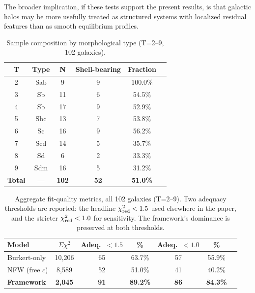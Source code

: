The broader implication, if these tests support the present results, is that galactic halos may be more usefully treated as structured systems with localized residual features than as smooth equilibrium profiles.


\begin{table}
\centering
\caption{Sample composition by morphological type (T=2--9, 102 galaxies).}
\label{tab:sample}
\begin{tabular}{cccccc}
\toprule
T & Type & N & Shell-bearing & Fraction \\
\midrule
2 & Sab & 9 & 9 & 100.0\% \\
3 & Sb  & 11 & 6 & 54.5\% \\
4 & Sb  & 17 & 9 & 52.9\% \\
5 & Sbc & 13 & 7 & 53.8\% \\
6 & Sc  & 16 & 9 & 56.2\% \\
7 & Scd & 14 & 5 & 35.7\% \\
8 & Sd  & 6  & 2 & 33.3\% \\
9 & Sdm & 16 & 5 & 31.2\% \\
\midrule
\textbf{Total} & --- & \textbf{102} & \textbf{52} & \textbf{51.0\%} \\
\bottomrule
\end{tabular}
\end{table}

\begin{table}
\centering
\caption{Aggregate fit-quality metrics, all 102 galaxies (T=2--9). Two adequacy thresholds are reported: the headline $\chi^2_{\rm red} < 1.5$ used elsewhere in the paper, and the stricter $\chi^2_{\rm red} < 1.0$ for sensitivity. The framework's dominance is preserved at both thresholds.}
\label{tab:aggregate}
\begin{tabular}{lcccccc}
\toprule
Model & $\Sigma\chi^2$ & Adeq.\ $<1.5$ & \% & Adeq.\ $<1.0$ & \% \\
\midrule
Burkert-only & 10{,}206 & 65 & 63.7\% & 57 & 55.9\% \\
NFW (free $c$) & 8{,}589 & 52 & 51.0\% & 41 & 40.2\% \\
\textbf{Framework} & \textbf{2{,}045} & \textbf{91} & \textbf{89.2\%} & \textbf{86} & \textbf{84.3\%} \\
\bottomrule
\end{tabular}
\end{table}

